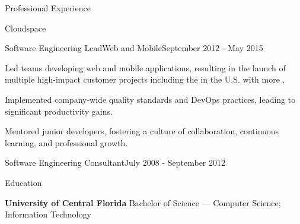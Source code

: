 \documentclass{resume} %
\begin{document}
\begin{rSection}{Professional Experience}
  \begin{rCompany}{Cloudspace}{}{}
    \begin{rRole}{Software Engineering Lead}{Web and Mobile}{September 2012 - May 2015}
      \item Led teams developing web and mobile applications, resulting in the launch of multiple high-impact customer projects including the  in the U.S. with more .
      \item Implemented company-wide quality standards and DevOps practices, leading to significant productivity gains.
      \item Mentored junior developers, fostering a culture of collaboration, continuous learning, and professional growth.
    \end{rRole}
  \end{rCompany}

  
  \begin{rCompany}{Software Engineering Consultant}{July 2008 - September 2012}{}

  \end{rCompany}
  
  
  
\end{rSection}


\vspace{0.5em} %
\begin{rSection}{Education}
  
  {\bf University of Central Florida } Bachelor of Science --- Computer Science; Information Technology
  
\end{rSection}
\end{document}
